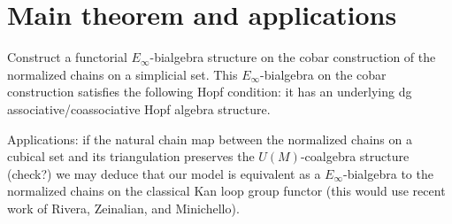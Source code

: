 \documentclass{amsart}
\begin{document}
\section{Main theorem and applications}

Construct a functorial $E_{\infty}$-bialgebra structure on the cobar construction of the normalized chains on a simplicial set. This $E_{\infty}$-bialgebra on the cobar construction satisfies the following Hopf condition: it has an underlying dg associative/coassociative Hopf algebra structure. 

Applications: if the natural chain map between the normalized chains on a cubical set and its triangulation preserves the $U(M)$-coalgebra structure (check?) we may deduce that our model is equivalent as a $E_{\infty}$-bialgebra to the normalized chains on the classical Kan loop group functor (this would use recent work of Rivera, Zeinalian, and Minichello). 


\end{document}
